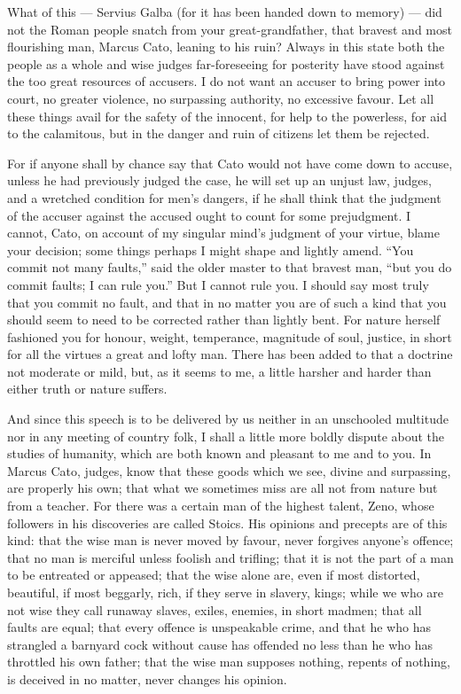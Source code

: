  What of this --- Servius Galba (for it has been handed down to memory) --- did not the Roman people snatch from your great-grandfather, that bravest and most flourishing man, Marcus Cato, leaning to his ruin? Always in this state both the people as a whole and wise judges far-foreseeing for posterity have stood against the too great resources of accusers. I do not want an accuser to bring power into court, no greater violence, no surpassing authority, no excessive favour. Let all these things avail for the safety of the innocent, for help to the powerless, for aid to the calamitous, but in the danger and ruin of citizens let them be rejected.

 For if anyone shall by chance say that Cato would not have come down to accuse, unless he had previously judged the case, he will set up an unjust law, judges, and a wretched condition for men's dangers, if he shall think that the judgment of the accuser against the accused ought to count for some prejudgment. I cannot, Cato, on account of my singular mind's judgment of your virtue, blame your decision; some things perhaps I might shape and lightly amend. ``You commit not many faults,'' said the older master to that bravest man, ``but you do commit faults; I can rule you.'' But I cannot rule you. I should say most truly that you commit no fault, and that in no matter you are of such a kind that you should seem to need to be corrected rather than lightly bent. For nature herself fashioned you for honour, weight, temperance, magnitude of soul, justice, in short for all the virtues a great and lofty man. There has been added to that a doctrine not moderate or mild, but, as it seems to me, a little harsher and harder than either truth or nature suffers.

 And since this speech is to be delivered by us neither in an unschooled multitude nor in any meeting of country folk, I shall a little more boldly dispute about the studies of humanity, which are both known and pleasant to me and to you. In Marcus Cato, judges, know that these goods which we see, divine and surpassing, are properly his own; that what we sometimes miss are all not from nature but from a teacher. For there was a certain man of the highest talent, Zeno, whose followers in his discoveries are called Stoics. His opinions and precepts are of this kind: that the wise man is never moved by favour, never forgives anyone's offence; that no man is merciful unless foolish and trifling; that it is not the part of a man to be entreated or appeased; that the wise alone are, even if most distorted, beautiful, if most beggarly, rich, if they serve in slavery, kings; while we who are not wise they call runaway slaves, exiles, enemies, in short madmen; that all faults are equal; that every offence is unspeakable crime, and that he who has strangled a barnyard cock without cause has offended no less than he who has throttled his own father; that the wise man supposes nothing, repents of nothing, is deceived in no matter, never changes his opinion.

